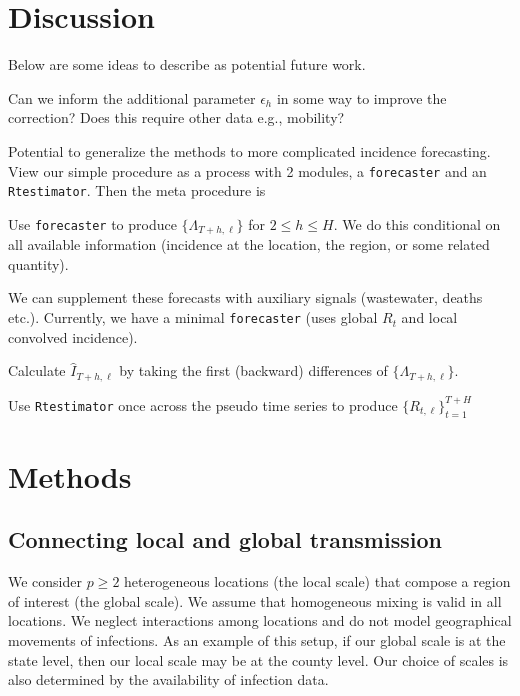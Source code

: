 \documentclass[12pt]{article}
\begin{document}
\section*{Discussion}

Below are some ideas to describe as potential future work.

\bitem
\item Can we inform the additional parameter $\epsilon_h$ in some way to improve
the correction? Does this require other data e.g., mobility?

\item Potential to generalize the methods to more complicated incidence forecasting.
View our simple procedure as a process with 2 modules, a
\texttt{forecaster} and an \texttt{Rtestimator}. Then the meta procedure is

\benum
\item Use \texttt{forecaster} to produce $\{\Lambda_{T+h, \ell}\}$ for $2\leq h
\leq H$. We do this conditional on all available information (incidence at the
location, the region, or some related quantity). 
\item We can supplement these forecasts with auxiliary signals (wastewater,
deaths etc.). Currently, we have a minimal \texttt{forecaster} (uses global $R_t$
and local convolved incidence).
\item Calculate $\hat{I}_{T+h, \ell}$ by taking the first (backward) differences
of $\{\Lambda_{T+h, \ell}\}$.
\item Use \texttt{Rtestimator} once across the pseudo time series to produce
$\{R_{t, \ell}\}_{t=1}^{T+H}$
\eenum

\eitem

\section*{Methods}
\subsection*{Connecting local and global transmission}\label{sec:bayes}

We consider $p\geq 2$ heterogeneous locations (the local scale) that compose a
region of interest (the global scale). We assume that homogeneous mixing is
valid in all locations. We neglect interactions among locations and do not model
geographical movements of infections. As an example of this setup, if our global
scale is at the state level, then our local scale may be at the county level.
Our choice of scales is also determined by the availability of infection data.
\end{document}
